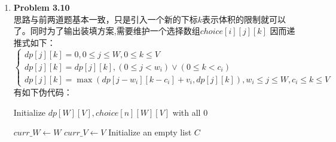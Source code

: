 \documentclass{ctexart}
\begin{document}
\begin{enumerate}[label=\arabic*.]
\begin{algorithm}[H]
            \Return $dp[M]$\;
        \end{algorithm}
        最坏情况下算法复杂度为$O(n{N})$
    \newpage
    \item \textbf{Problem 3.10}\\
        思路与前两道题基本一致，只是引入一个新的下标$k$表示体积的限制就可以了。同时为了输出装填方案,需要维护一个选择数组$choice[i][j][k]$
        因而递推式如下：\[\begin{cases}
            dp[j][k]=0, 0\le{j}\le{W}, 0\le{k}\le{V}\\
            dp[j][k]=dp[j][k], (0\le{j}<w_i) \lor (0\le{k}<c_i)\\
            dp[j][k]=\max(dp[j-w_i][k-c_i]+v_i, dp[j][k]), w_i\le{j}\le{W}, c_i\le{k}\le{V}
        \end{cases}\]
        有如下伪代码：\\
        \begin{algorithm}[H]
            \caption{背包问题的二维推广版本}
            \SetAlgoLined
            
            Initialize $dp[W][V], choice[n][W][V]$ with all $0$\;
            
            $curr\_W \leftarrow W$\; 
            $curr\_V \leftarrow V$\;
            Initialize an empty list $C$\;
            

\end{algorithm}
\end{enumerate}
\end{document}
